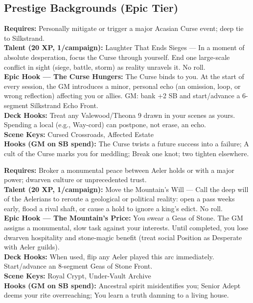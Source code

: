\documentclass[12pt]{article}
\begin{document}
\subsection*{Prestige Backgrounds (Epic Tier)}

\begin{description}[leftmargin=*]
  
  \item[\textbf{The Cursed Child of Silkstrand}] 
  \textbf{Requires:} Personally mitigate or trigger a major Acasian Curse event; deep tie to Silkstrand. \\
  \textbf{Talent (20 XP, 1/campaign):} Laughter That Ends Sieges --- In a moment of absolute desperation, focus the Curse through yourself. End one large-scale conflict in sight (siege, battle, storm) as reality unravels it. No roll. \\
  \textbf{Epic Hook --- The Curse Hungers:} The Curse binds to you. At the start of every session, the GM introduces a minor, personal echo (an omission, loop, or wrong reflection) affecting you or allies. GM: bank +2 SB and start/advance a 6-segment Silkstrand Echo Front. \\
  \textbf{Deck Hooks:} Treat any Valewood/Theona 9 drawn in your scenes as yours. Spending a local (e.g., Way-cord) can postpone, not erase, an echo. \\
  \textbf{Scene Keys:} Cursed Crossroads, Affected Estate \\
  \textbf{Hooks (GM on SB spend):} The Curse twists a future success into a failure; A cult of the Curse marks you for meddling; Break one knot; two tighten elsewhere.

  \item[\textbf{Stone-Speaker of Khaz-Vurim}] 
  \textbf{Requires:} Broker a monumental peace between Aeler holds or with a major power; dwarven culture or unprecedented trust. \\
  \textbf{Talent (20 XP, 1/campaign):} Move the Mountain's Will --- Call the deep will of the Aelerians to reroute a geological or political reality: open a pass weeks early, flood a rival shaft, or cause a hold to ignore a king's edict. No roll. \\
  \textbf{Epic Hook --- The Mountain's Price:} You swear a Geas of Stone. The GM assigns a monumental, slow task against your interests. Until completed, you lose dwarven hospitality and stone-magic benefit (treat social Position as Desperate with Aeler guilds). \\
  \textbf{Deck Hooks:} When used, flip any Aeler played this arc immediately. Start/advance an 8-segment Geas of Stone Front. \\
  \textbf{Scene Keys:} Royal Crypt, Under-Vault Archive \\
  \textbf{Hooks (GM on SB spend):} Ancestral spirit misidentifies you; Senior Adept deems your rite overreaching; You learn a truth damning to a living house.


\end{description}
\end{document}
